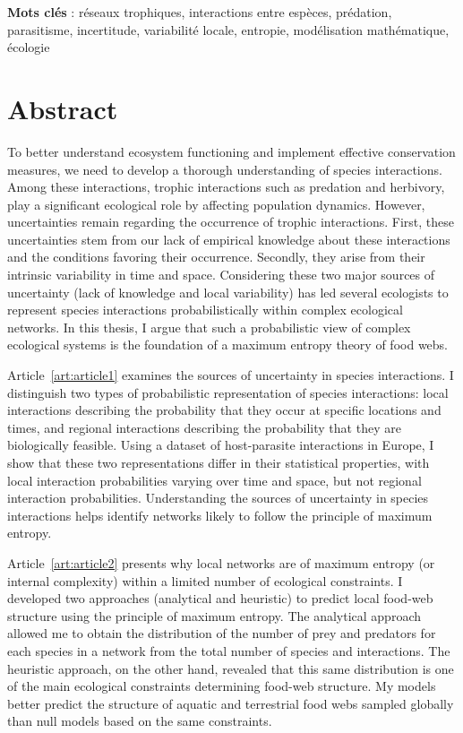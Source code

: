 \documentclass[12pt,twoside,phd]{dms}
\numberwithin{equation}{section}
\numberwithin{table}{chapter}
\numberwithin{figure}{chapter}
\begin{document}
\textbf{Mots clés} : réseaux trophiques, interactions entre espèces, prédation, parasitisme, incertitude, variabilité locale, entropie, modélisation mathématique, écologie


\anglais
\chapter*{Abstract}

To better understand ecosystem functioning and implement effective conservation
measures, we need to develop a thorough understanding of species
interactions. Among these interactions, trophic interactions such as predation
and herbivory, play a significant ecological role by affecting
population dynamics. However, uncertainties remain regarding the occurrence of
trophic interactions. First, these uncertainties stem from our lack of empirical
knowledge about these interactions and the conditions favoring their occurrence.
Secondly, they arise from their intrinsic variability in time and space.
Considering these two major sources of uncertainty (lack of knowledge and local
variability) has led several ecologists to represent species interactions
probabilistically within complex ecological networks. In this thesis, I argue
that such a probabilistic view of complex ecological systems is the foundation
of a maximum entropy theory of food webs.

Article~\ref{art:article1} examines the sources of uncertainty in species
interactions. I distinguish two types of probabilistic representation of species
interactions: local interactions describing the probability that they occur at
specific locations and times, and regional interactions describing the
probability that they are biologically feasible. Using a dataset of
host-parasite interactions in Europe, I show that these two representations
differ in their statistical properties, with local interaction probabilities
varying over time and space, but not regional interaction probabilities.
Understanding the sources of uncertainty in species interactions helps identify
networks likely to follow the principle of maximum entropy.

Article~\ref{art:article2} presents why local networks are of maximum entropy
(or internal complexity) within a limited number of ecological constraints. I
developed two approaches (analytical and heuristic) to predict local food-web
structure using the principle of maximum entropy. The analytical approach
allowed me to obtain the distribution of the number of prey and predators for
each species in a network from the total number of species and interactions. The
heuristic approach, on the other hand, revealed that this same distribution is
one of the main ecological constraints determining food-web structure. My models
better predict the structure of aquatic and terrestrial food webs sampled
globally than null models based on the same constraints.
\end{document}
